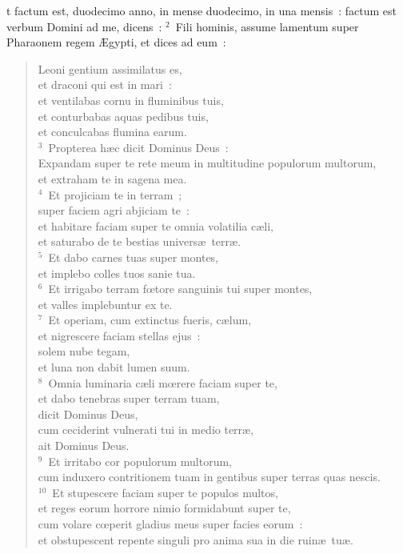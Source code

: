 \bchapter
{}t factum est, duodecimo anno, in mense duodecimo, in una mensis~: factum est verbum Domini ad me, dicens~:
${}^{2}$~Fili hominis, assume lamentum super Pharaonem regem \AE gypti, et dices ad eum~: \begin{verse}Leoni gentium assimilatus es,\\ et draconi qui est in mari~:\\ et ventilabas cornu in fluminibus tuis,\\ et conturbabas aquas pedibus tuis,\\ et conculcabas flumina earum.\\
${}^{3}$~Propterea h\ae c dicit Dominus Deus~:\\ Expandam super te rete meum in multitudine populorum multorum,\\ et extraham te in sagena mea.\\
${}^{4}$~Et projiciam te in terram~;\\ super faciem agri abjiciam te~:\\ et habitare faciam super te omnia volatilia c\ae li,\\ et saturabo de te bestias univers\ae\ terr\ae .\\
${}^{5}$~Et dabo carnes tuas super montes,\\ et implebo colles tuos sanie tua.\\
${}^{6}$~Et irrigabo terram fœtore sanguinis tui super montes,\\ et valles implebuntur ex te.\\
${}^{7}$~Et operiam, cum extinctus fueris, c\ae lum,\\ et nigrescere faciam stellas ejus~:\\ solem nube tegam,\\ et luna non dabit lumen suum.\\
${}^{8}$~Omnia luminaria c\ae li mœrere faciam super te,\\ et dabo tenebras super terram tuam,\\ dicit Dominus Deus,\\ cum ceciderint vulnerati tui in medio terr\ae ,\\ ait Dominus Deus.\\
${}^{9}$~Et irritabo cor populorum multorum,\\ cum induxero contritionem tuam in gentibus super terras quas nescis.\\
${}^{10}$~Et stupescere faciam super te populos multos,\\ et reges eorum horrore nimio formidabunt super te,\\ cum volare cœperit gladius meus super facies eorum~:\\ et obstupescent repente singuli pro anima sua in die ruin\ae\ tu\ae .\\

\end{verse}
